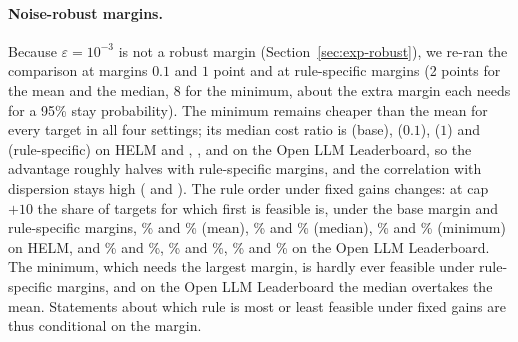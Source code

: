 \paragraph{Noise-robust margins.} Because $\varepsilon=10^{-3}$ is not a robust margin (Section~\ref{sec:exp-robust}), we re-ran the comparison at margins $0.1$ and $1$ point and at rule-specific margins (2 points for the mean and the median, 8 for the minimum, about the extra margin each needs for a 95\% stay probability). The minimum remains cheaper than the mean for every target in all four settings; its median cost ratio is \mrHelmBaseRatio{} (base), \mrHelmTenthRatio{} ($0.1$), \mrHelmOneRatio{} ($1$) and \mrHelmRuleRatio{} (rule-specific) on HELM and \mrOllbBaseRatio, \mrOllbTenthRatio, \mrOllbOneRatio{} and \mrOllbRuleRatio{} on the Open LLM Leaderboard, so the advantage roughly halves with rule-specific margins, and the correlation with dispersion stays high (\mrHelmRuleRho{} and \mrOllbRuleRho). The rule order under fixed gains changes: at cap $+10$ the share of targets for which first is feasible is, under the base margin and rule-specific margins, \mrFeasHelmBaseMean\% and \mrFeasHelmRuleMean\% (mean), \mrFeasHelmBaseMedian\% and \mrFeasHelmRuleMedian\% (median), \mrFeasHelmBaseMin\% and \mrFeasHelmRuleMin\% (minimum) on HELM, and \mrFeasOllbBaseMean\% and \mrFeasOllbRuleMean\%, \mrFeasOllbBaseMedian\% and \mrFeasOllbRuleMedian\%, \mrFeasOllbBaseMin\% and \mrFeasOllbRuleMin\% on the Open LLM Leaderboard. The minimum, which needs the largest margin, is hardly ever feasible under rule-specific margins, and on the Open LLM Leaderboard the median overtakes the mean. Statements about which rule is most or least feasible under fixed gains are thus conditional on the margin.

